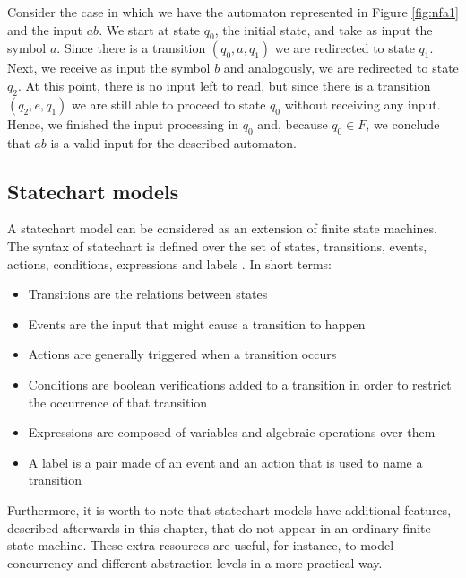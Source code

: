 Consider the case in which we have the automaton represented in Figure \ref{fig:nfa1} and the input $ab$. We start at state $q_0$, the initial state, and take as input the symbol $a$. Since there is a transition $(q_0,a,q_1)$ we are redirected to state $q_1$. Next, we receive as input the symbol $b$ and analogously, we are redirected to state $q_2$. At this point, there is no input left to read, but since there is a transition $(q_2,e,q_1)$ we are still able to proceed to state $q_0$ without receiving any input. Hence, we finished the input processing in $q_0$ and, because $q_0 \in F$, we conclude that $ab$ is a valid input for the described automaton.

\subsection{Statechart models}

A statechart model can be considered as an extension of finite state machines. The syntax of statechart is defined over the set of states, transitions, events, actions, conditions, expressions and labels \cite{harel87:semantics_statecharts}. In short terms:

\begin{itemize}

\item Transitions are the relations between states

\item Events are the input that might cause a transition to happen

\item Actions are generally triggered when a transition occurs

\item Conditions are boolean verifications added to a transition in order to restrict the occurrence of that transition

\item Expressions are composed of variables and algebraic operations over them

\item A label is a pair made of an event and an action that is used to name a transition
\end{itemize}

Furthermore, it is worth to note that statechart models have additional features, described afterwards in this chapter, that do not appear in an ordinary finite state machine. These extra resources are useful, for instance, to model concurrency and different abstraction levels in a more practical way.

